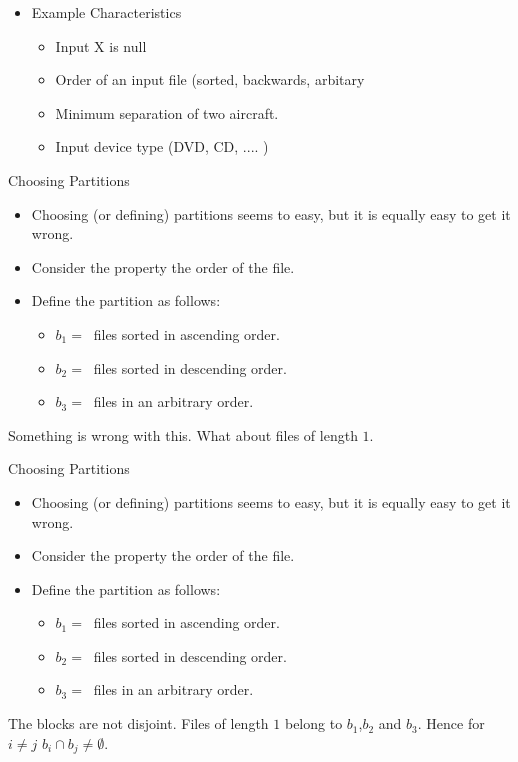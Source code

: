 \documentclass{beamer}
\begin{document}
\begin{frame}
  \begin{itemize}
  \item Example Characteristics
    \begin{itemize}
    \item Input X is null
    \item Order of an input file (sorted, backwards, arbitary
    \item Minimum separation of two aircraft.
    \item Input device type (DVD, CD, .... )
    \end{itemize}
  \end{itemize}
\end{frame}
\begin{frame}{Choosing Partitions}
  \begin{itemize}
  \item Choosing (or defining) partitions seems to easy, but it is
    equally easy to get it wrong.
  \item Consider the property the order of the file.
  \item Define the partition as follows:
    \begin{itemize}
    \item $b_1 = \ $ files sorted in ascending order.
    \item $b_2 = \ $ files sorted in descending order.
    \item $b_3 = \ $ files in an arbitrary order.
    \end{itemize}
  \end{itemize}
  Something is wrong with this. What about files of length $1$.
\end{frame}
\begin{frame}{Choosing Partitions}
  \begin{itemize}
  \item Choosing (or defining) partitions seems to easy, but it is
    equally easy to get it wrong.
  \item Consider the property the order of the file.
  \item Define the partition as follows:
    \begin{itemize}
    \item $b_1 = \ $ files sorted in ascending order.
    \item $b_2 = \ $ files sorted in descending order.
    \item $b_3 = \ $ files in an arbitrary order.
    \end{itemize}
  \end{itemize}
 The blocks are not disjoint. Files of length $1$ belong to
 $b_1$,$b_2$ and $b_3$. Hence for $i\neq j$ $b_i \cap b_j \neq \emptyset$.

\end{frame}
\end{document}
